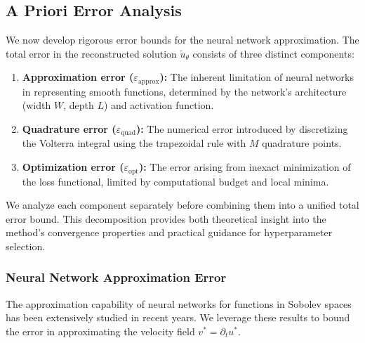\documentclass[11pt,reqno]{amsart}
\theoremstyle{plain}
\theoremstyle{definition}
\theoremstyle{remark}
\begin{document}
\subsection{A Priori Error Analysis}

We now develop rigorous error bounds for the neural network approximation. The total error in the reconstructed solution $\tilde{u}_\theta$ consists of three distinct components:

\begin{enumerate}
    \item \textbf{Approximation error ($\varepsilon_{\mathrm{approx}}$):} The inherent limitation of neural networks in representing smooth functions, determined by the network's architecture (width $W$, depth $L$) and activation function.
    
    \item \textbf{Quadrature error ($\varepsilon_{\mathrm{quad}}$):} The numerical error introduced by discretizing the Volterra integral using the trapezoidal rule with $M$ quadrature points.
    
    \item \textbf{Optimization error ($\varepsilon_{\mathrm{opt}}$):} The error arising from inexact minimization of the loss functional, limited by computational budget and local minima.
\end{enumerate}

\noindent We analyze each component separately before combining them into a unified total error bound. This decomposition provides both theoretical insight into the method's convergence properties and practical guidance for hyperparameter selection.

\subsubsection{Neural Network Approximation Error}

The approximation capability of neural networks for functions in Sobolev spaces has been extensively studied in recent years. We leverage these results to bound the error in approximating the velocity field $v^* = \partial_t u^*$.
\end{document}
